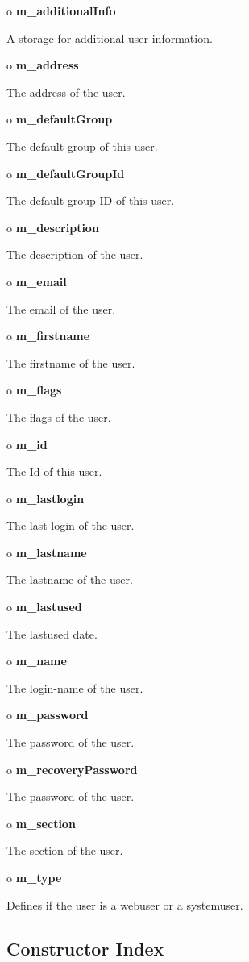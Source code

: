 \begin{description}
\item o {\bf m\_additionalInfo}  

A storage for additional user information.  
\item o {\bf m\_address}  

The address of the user.  
\item o {\bf m\_defaultGroup}  

The default group of this user.  
\item o {\bf m\_defaultGroupId}  

The default group ID of this user.  
\item o {\bf m\_description}  

The description of the user.  
\item o {\bf m\_email}  

The email of the user.  
\item o {\bf m\_firstname}  

The firstname of the user.  
\item o {\bf m\_flags}  

The flags of the user.  
\item o {\bf m\_id}  

The Id of this user.  
\item o {\bf m\_lastlogin}  

The last login of the user.  
\item o {\bf m\_lastname}  

The lastname of the user.  
\item o {\bf m\_lastused}  

The lastused date.  
\item o {\bf m\_name}  

The login-name of the user.  
\item o {\bf m\_password}  

The password of the user.  
\item o {\bf m\_recoveryPassword}  

The password of the user.  
\item o {\bf m\_section}  

The section of the user.  
\item o {\bf m\_type}  

Defines if the user is a webuser or a systemuser. 
\end{description}

\subsection*{  Constructor Index }


